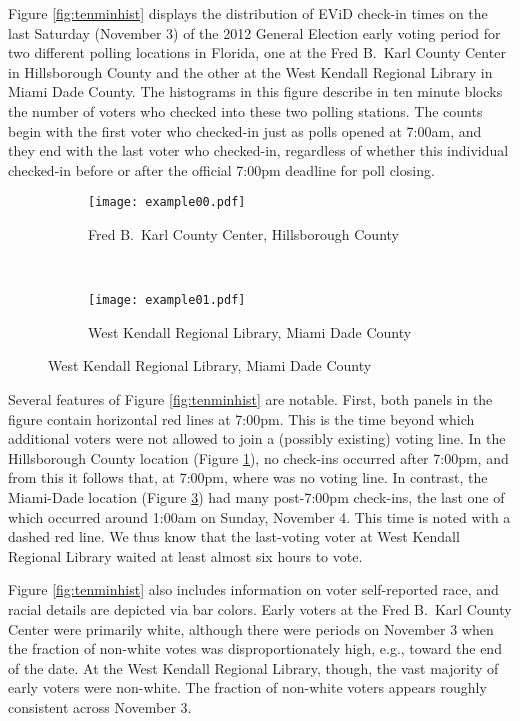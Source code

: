 \documentclass[12pt,titlepage]{article}
\begin{document}
Figure \ref{fig:tenminhist} displays the distribution of EViD check-in
times on the last Saturday (November 3) of the 2012 General Election
early voting period for two different polling locations in Florida,
one at the Fred B.\ Karl County Center in Hillsborough County and the
other at the West Kendall Regional Library in Miami Dade County.  The
histograms in this figure describe in ten minute blocks the number of
voters who checked into these two polling stations.  The counts begin
with the first voter who checked-in just as polls opened at 7:00am,
and they end with the last voter who checked-in, regardless of whether
this individual checked-in before or after the official 7:00pm
deadline for poll closing.

\begin{figure}[!ht]
  \caption{Early voting check-in times on Saturday, November 3, 2012, in two Florida locations}
  \label{fig:tenminhist}
  \centering
  \begin{subfigure}[b]{\linewidth}
    \centering\texttt{[image: example00.pdf]}
    \caption{Fred B.\ Karl County Center, Hillsborough County}
    \label{fig:karlexample}
  \end{subfigure}%
  \\
  \begin{subfigure}[b]{\linewidth}
    \centering\texttt{[image: example01.pdf]}
    \caption{West Kendall Regional Library, Miami Dade County}
    \label{fig:kendallexample}
  \end{subfigure}
\end{figure}

Several features of Figure \ref{fig:tenminhist} are notable.  First,
both panels in the figure contain horizontal red lines at 7:00pm.
This is the time beyond which additional voters were not allowed to
join a (possibly existing) voting line.  In the Hillsborough County
location (Figure \ref{fig:karlexample}), no check-ins occurred after
7:00pm, and from this it follows that, at 7:00pm, where was no voting
line.  In contrast, the Miami-Dade location (Figure
\ref{fig:kendallexample}) had many post-7:00pm check-ins, the last one
of which occurred around 1:00am on Sunday, November 4.  This time is
noted with a dashed red line.  We thus know that the last-voting voter
at West Kendall Regional Library waited at least almost six hours to
vote.

Figure \ref{fig:tenminhist} also includes information on voter
self-reported race, and racial details are depicted via bar colors.
Early voters at the Fred B.\ Karl County Center were primarily white,
although there were periods on November 3 when the fraction of
non-white votes was disproportionately high, e.g., toward the end of
the date.  At the West Kendall Regional Library, though, the vast
majority of early voters were non-white.  The fraction of non-white
voters appears roughly consistent across November 3.
\end{document}
